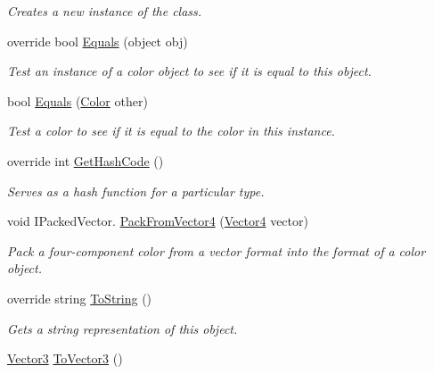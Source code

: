 \begin{DoxyCompactItemize}
\begin{DoxyCompactList}\small\item\em Creates a new instance of the class.\end{DoxyCompactList}\item 
override bool \hyperlink{structMicrosoft_1_1Xna_1_1Framework_1_1Color_aadf763f0213fc2f3875230b06bb0b6cf}{Equals} (object obj)
\begin{DoxyCompactList}\small\item\em Test an instance of a color object to see if it is equal to this object.\end{DoxyCompactList}\item 
bool \hyperlink{structMicrosoft_1_1Xna_1_1Framework_1_1Color_a9052d75b1b8d88b1c008792a0f9ed450}{Equals} (\hyperlink{structMicrosoft_1_1Xna_1_1Framework_1_1Color}{Color} other)
\begin{DoxyCompactList}\small\item\em Test a color to see if it is equal to the color in this instance.\end{DoxyCompactList}\item 
override int \hyperlink{structMicrosoft_1_1Xna_1_1Framework_1_1Color_a77e1afa2b6dee1ed3640da81d7407b42}{Get\+Hash\+Code} ()
\begin{DoxyCompactList}\small\item\em Serves as a hash function for a particular type.\end{DoxyCompactList}\item 
void I\+Packed\+Vector. \hyperlink{structMicrosoft_1_1Xna_1_1Framework_1_1Color_afa02420fa8219ae80a0d93b42d7f41d3}{Pack\+From\+Vector4} (\hyperlink{structMicrosoft_1_1Xna_1_1Framework_1_1Vector4}{Vector4} vector)
\begin{DoxyCompactList}\small\item\em Pack a four-\/component color from a vector format into the format of a color object.\end{DoxyCompactList}\item 
override string \hyperlink{structMicrosoft_1_1Xna_1_1Framework_1_1Color_aa73e7c4dd1df5fd5fbf81c7764ee1533}{To\+String} ()
\begin{DoxyCompactList}\small\item\em Gets a string representation of this object.\end{DoxyCompactList}\item 
\hyperlink{structMicrosoft_1_1Xna_1_1Framework_1_1Vector3}{Vector3} \hyperlink{structMicrosoft_1_1Xna_1_1Framework_1_1Color_ad4d650fa1888777702f3e23a7a556b78}{To\+Vector3} ()

\end{DoxyCompactItemize}
